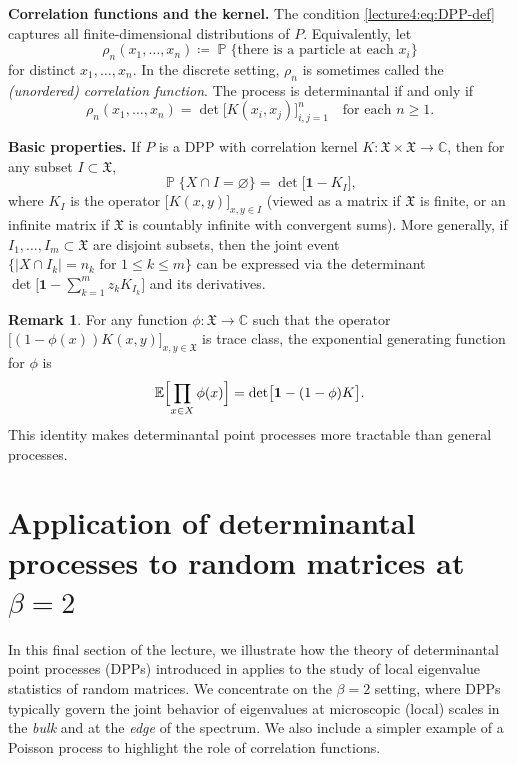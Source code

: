 \documentclass[letterpaper,11pt,oneside,reqno]{book}
\numberwithin{equation}{chapter}  %
\theoremstyle{definition}
\newtheorem{remark}[proposition]{Remark}
\begin{document}
\noindent\textbf{Correlation functions and the kernel.}
The condition \eqref{lecture4:eq:DPP-def} captures all finite-dimensional distributions of \(P\).
Equivalently, let
\[
	\rho_n(x_1,\dots,x_n) \coloneqq \operatorname{\mathbb{P}}\{\text{there is a particle at each }x_i\}
\]
for distinct \(x_1,\dots,x_n\). In the discrete setting, \(\rho_n\) is
sometimes called the \emph{(unordered) correlation function}. The process is
determinantal if and only if
\[
\rho_n(x_1,\dots,x_n) = \det\bigl[K(x_i,x_j)\bigr]_{i,j=1}^n
\quad
\text{for each }n\ge1.
\]

\noindent\textbf{Basic properties.} If \(P\) is a DPP with correlation kernel
\(K\colon \mathfrak{X}\times\mathfrak{X}\to\mathbb{C}\), then for any subset \(I\subset \mathfrak{X}\),
\begin{equation}
\label{lecture4:eq:prob-empty-set-DPP}
\operatorname{\mathbb{P}}\{X\cap I = \varnothing\} = \det\bigl[\mathbf{1} - K_I\bigr],
\end{equation}
where \(K_I\) is the operator \(\bigl[K(x,y)\bigr]_{x,y\in I}\)
(viewed as a matrix if \(\mathfrak{X}\) is finite, or an infinite matrix if \(\mathfrak{X}\) is
countably infinite with convergent sums). More generally, if \(I_1,\dots,I_m\subset \mathfrak{X}\)
are disjoint subsets, then the joint event \(\{|X\cap I_k|=n_k\text{ for }1\le k\le m\}\)
can be expressed via the determinant
\(\det\bigl[\mathbf{1}-\sum_{k=1}^m z_k K_{I_k}\bigr]\)
and its derivatives.

\begin{remark}
For any function \(\phi:\mathfrak{X}\to\mathbb{C}\) such that the operator
\(\bigl[(1-\phi(x))K(x,y)\bigr]_{x,y\in\mathfrak{X}}\) is trace class, the
exponential generating function for \(\phi\) is
\[
\mathbb{E}\Bigl[\prod_{x\in X}\phi(x)\Bigr] = \det\bigl[\mathbf{1} - (1-\phi)K\bigr].
\]
This identity makes determinantal point processes more tractable than general processes.
\end{remark}


\section{Application of determinantal processes to random matrices at \texorpdfstring{$\beta=2$}{beta=2}}

In this final section of the lecture, we illustrate how the theory of determinantal point processes (DPPs)
introduced in 
applies to the study of local eigenvalue statistics of random matrices.
We concentrate on the \(\beta=2\) setting, where DPPs typically
govern the joint behavior of eigenvalues at microscopic (local)
scales in the \emph{bulk} and at the \emph{edge} of the spectrum.
We also include a simpler example of a Poisson process to highlight
the role of correlation functions.
\end{document}
